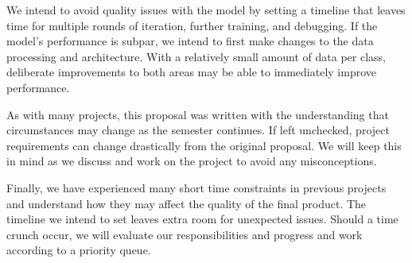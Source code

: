 \documentclass{article} %
\begin{document}
We intend to avoid quality issues with the model by setting a timeline that leaves time for multiple rounds of iteration, further training, and debugging. If the model's performance is subpar, we intend to first make changes to the data processing and architecture. With a relatively small amount of data per class, deliberate improvements to both areas may be able to immediately improve performance.

As with many projects, this proposal was written with the understanding that circumstances may change as the semester continues. If left unchecked, project requirements can change drastically from the original proposal. We will keep this in mind as we discuss and work on the project to avoid any misconceptions.

Finally, we have experienced many short time constraints in previous projects and understand how they may affect the quality of the final product. The timeline we intend to set leaves extra room for unexpected issues. Should a time crunch occur, we will evaluate our responsibilities and progress and work according to a priority queue.

\label{last_page}



\end{document}
